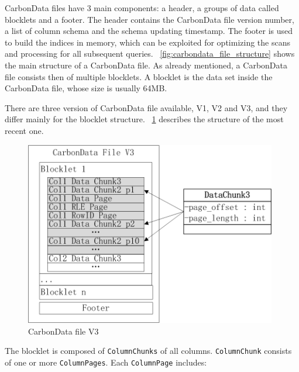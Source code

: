 \documentclass[10pt, a4paper]{report}
\begin{document}
CarbonData files have 3 main components: a header, a groups of data called blocklets and a footer. The header contains the CarbonData file version number, a list of column schema and the schema updating timestamp. The footer is used to build the indices in memory, which can be exploited for optimizing the scans and processing for all subsequent queries\cite{carbondata_structure}. \figurename~\ref{fig:carbondata_file_structure} shows the main structure of a CarbonData file. As already mentioned, a CarbonData file consists then of multiple blocklets. A blocklet is the data set inside the CarbonData file, whose size is usually 64MB.

There are three version of CarbonData file available, V1, V2 and V3, and they differ mainly for the blocklet structure. \figurename~\ref{fig:carbondata_file_v3} describes the structure of the most recent one.

\begin{figure}
	\centering
	\includegraphics[width=11cm]{./assets/img/carbondata/carbondata_blocklet.png}
	\caption{CarbonData file V3}
	\label{fig:carbondata_file_v3}
	\vspace{0.5cm}
\end{figure}

The blocklet is composed of \texttt{ColumnChunks} of all columns. \texttt{ColumnChunk} consists of one or more \texttt{ColumnPages}. Each \texttt{ColumnPage} includes: \\
\end{document}
